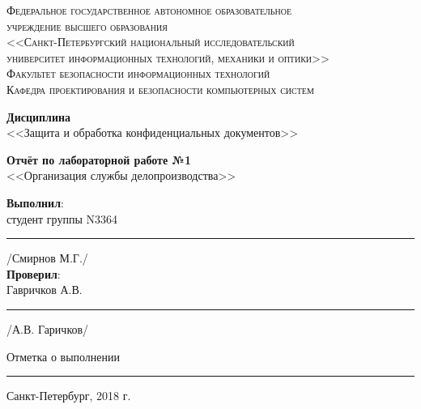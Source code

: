 \documentclass[a4paper,12pt]{article}
\begin{document}
	\begin{titlepage}
		\begin{center}
			\textsc{
				\fontsize{12pt}{14pt}\selectfont
				Федеральное государственное автономное образовательное\\
				учреждение высшего образования\\
				<<Санкт-Петербургский национальный исследовательский\\
				университет информационных технологий, механики и оптики>>\\
				Факультет безопасности информационных технологий\\
				Кафедра проектирования и безопасности компьютерных систем\\}
			
			\vfill
			
			\textbf{Дисциплина}\\
			<<Защита и обработка конфиденциальных документов>>\\
			
			\vfill
			
			\textbf{Отчёт по лабораторной работе №1}\\
			<<Организация службы делопроизводства>>\\
			
		\end{center}
		
		\vfill
		
		\begin{flushright}
			\textbf{Выполнил}: \\
			студент группы N3364\\
			\rule{10em}{.1pt} /Смирнов М.Г./\\
			\vfill
			\textbf{Проверил}:\\
			Гавричков А.В.\\
			
			\rule{10em}{.1pt} /А.В. Гаричков/\\
			
			\vfill
			
			Отметка о выполнении \rule{10em}{.1pt}
			
			
			
			
			
		\end{flushright}
		\vfill
		\begin{center}
			Санкт-Петербург, 2018 г.
		\end{center}
	\end{titlepage}
\pagestyle{empty}
	
\end{document}
